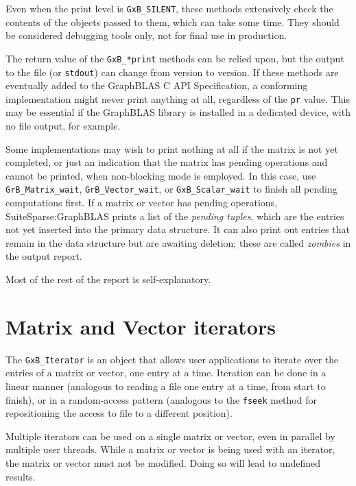 \documentclass[12pt]{article}
\begin{document}
Even when the print level is \verb'GxB_SILENT', these methods extensively check
the contents of the objects passed to them, which can take some time.  They
should be considered debugging tools only, not for final use in production.

The return value of the \verb'GxB_*print' methods can be relied upon, but the
output to the file (or \verb'stdout') can change from version to version.  If
these methods are eventually added to the GraphBLAS C API Specification, a
conforming implementation might never print anything at all, regardless of the
\verb'pr' value.  This may be essential if the GraphBLAS library is installed
in a dedicated device, with no file output, for example.

Some implementations may wish to print nothing at all if the matrix is not yet
completed, or just an indication that the matrix has pending operations and
cannot be printed, when non-blocking mode is employed.  In this case, use
\verb'GrB_Matrix_wait', \verb'GrB_Vector_wait', or \verb'GxB_Scalar_wait' to
finish all pending computations first.  If a matrix or vector has pending
operations, SuiteSparse:GraphBLAS prints a list of the {\em pending tuples},
which are the entries not yet inserted into the primary data structure.  It can
also print out entries that remain in the data structure but are awaiting
deletion; these are called {\em zombies} in the output report.

Most of the rest of the report is self-explanatory.

\newpage
\section{Matrix and Vector iterators} %
\label{iter}

The \verb'GxB_Iterator' is an object that allows user applications to iterate
over the entries of a matrix or vector, one entry at a time.  Iteration can
be done in a linear manner (analogous to reading a file one entry at a time,
from start to finish), or in a random-access pattern (analogous to
the \verb'fseek' method for repositioning the access to file to a different
position).

Multiple iterators can be used on a single matrix or vector, even in parallel
by multiple user threads.  While a matrix or vector is being used with an
iterator, the matrix or vector must not be modified.  Doing so will lead to
undefined results.
\end{document}
